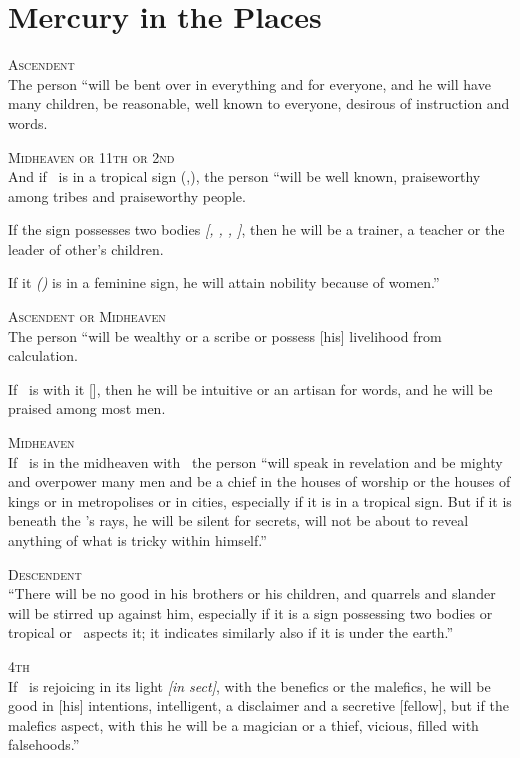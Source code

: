 \section{Mercury in the Places}

\noindent\textsc{Ascendent} \hfill \\
\indent The person ``will be bent over in everything and for everyone, and he will have many children, be reasonable, well known to everyone, desirous of instruction and words.

\noindent\textsc{Midheaven or 11th or 2nd} \hfill \\
\indent And if \Mercury\, is in a tropical sign (\Aries,\Libra), the person ``will be well known, praiseworthy among tribes and praiseworthy people. 

If the sign possesses two bodies \textsl{[\Gemini, \Virgo, \Sagittarius, \Pisces]}, then he will be a trainer, a teacher or the leader of other's children.

If it \textsl{(\Mercury)} is in a feminine sign, he will attain nobility because of women.''

\noindent\textsc{Ascendent or Midheaven} \hfill \\
\indent The person ``will be wealthy or a scribe or possess [his] livelihood from calculation.

If \Venus\, is with it [\Mercury], then he will be intuitive or an artisan for words, and he will be praised among most men.

\noindent\textsc{Midheaven} \hfill \\
If \Mercury\, is in the midheaven with \Jupiter\, the person ``will speak in revelation and be mighty and overpower many men and be a chief in the houses of worship or the houses of kings or in metropolises or in cities, especially if it is in a tropical sign. But if it is beneath the \Sun's rays, he will be silent for secrets, will not be about to reveal anything of what is tricky within himself.''

\noindent\textsc{Descendent} \hfill \\
\indent ``There will be no good in his brothers or his children, and quarrels and slander will be stirred up against him, especially if it is a sign possessing two bodies or tropical or \Mars\, aspects it; it indicates similarly also if it is under the earth.''

\noindent\textsc{4th} \hfill \\
\indent If \Mercury\, is rejoicing in its light \textsl{[in sect]}, with the benefics or the malefics, he will be good in [his] intentions, intelligent, a disclaimer and a secretive [fellow], but if the malefics aspect, with this he will be a magician or a thief, vicious, filled with falsehoods.''



